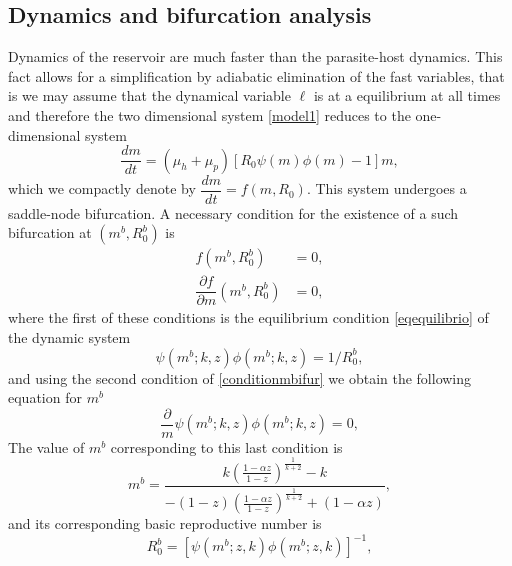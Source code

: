 \documentclass[eng]{MMSB-class-eng}
\begin{document}
{}



\subsection{Dynamics and bifurcation analysis}\label{bifurcacion}

{\color{red}
 Dynamics of the reservoir are much faster than the parasite-host dynamics. This fact allows for a simplification by adiabatic elimination of the fast variables, that is we may assume that the dynamical variable $\ell$ is at a equilibrium at all times and therefore the two dimensional system \eqref{model1} reduces to the one-dimensional system 
\begin{equation*}
\dfrac{dm}{dt}=(\mu_h + \mu_p)\left[ R_0  \psi(m)\phi(m) -1 \right] m,
\end{equation*}
which we compactly denote by
$\dfrac{dm}{dt}=f(m,R_0)$.
This system undergoes a saddle-node bifurcation. 
A necessary condition for the existence of a such bifurcation at 
$(m^{b},R_0^b)$ is
\begin{equation}\label{conditionmbifur}
\begin{split}
f(m^b,R_0^b)&=0,\\
\dfrac{\partial f}{\partial m}(m^b,R_0^b)&=0,
\end{split}
\end{equation}
where the first of these conditions is the equilibrium condition \eqref{eqequilibrio} of the dynamic system
\begin{equation*}
\psi(m^b;k,z)\phi(m^b;k,z)=1/R_0^b,
\end{equation*}
and using the second condition of \eqref{conditionmbifur} we obtain the following equation for $m^b$
\begin{equation}
\frac{\partial }{m}\psi(m^b;k,z)\phi(m^b;k,z)=0,	
\end{equation}
The value of $m^b$ corresponding to this last condition is
\begin{equation}
m^b=\dfrac{k\left( \frac{1-\alpha z}{1-z}\right)^{\frac{1}{k+2}} - k}{-(1-z)\left( \frac{1-\alpha z}{1-z}\right)^{\frac{1}{k+2}} + (1-\alpha z)},	
\end{equation}
and its corresponding basic reproductive number is
\begin{equation}
R_0^b=\left[ \psi(m^b;z,k)\phi(m^b;z,k)\right]^{-1},
\end{equation}	

}
\end{document}
